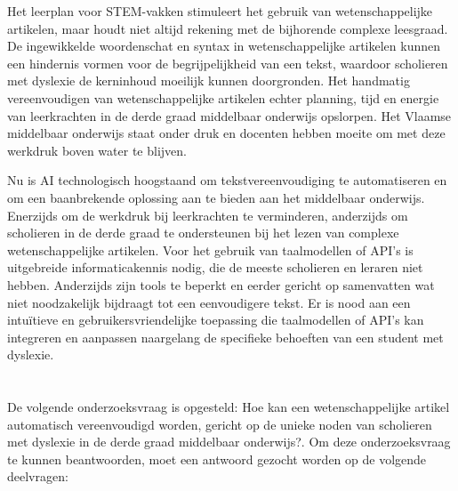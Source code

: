 \medspace

Het leerplan voor STEM-vakken stimuleert het gebruik van wetenschappelijke artikelen, maar houdt niet altijd rekening met de bijhorende complexe leesgraad. De ingewikkelde woordenschat en syntax in wetenschappelijke artikelen kunnen een hindernis vormen voor de begrijpelijkheid van een tekst, waardoor scholieren met dyslexie de kerninhoud moeilijk kunnen doorgronden. Het handmatig vereenvoudigen van wetenschappelijke artikelen echter planning, tijd en energie van leerkrachten in de derde graad middelbaar onderwijs opslorpen. Het Vlaamse middelbaar onderwijs staat onder druk en docenten hebben moeite om met deze werkdruk boven water te blijven. 

\medspace

Nu is AI technologisch hoogstaand om tekstvereenvoudiging te automatiseren en om een baanbrekende oplossing aan te bieden aan het middelbaar onderwijs. Enerzijds om de werkdruk bij leerkrachten te verminderen, anderzijds om scholieren in de derde graad te ondersteunen bij het lezen van complexe wetenschappelijke artikelen. Voor het gebruik van taalmodellen of API's is uitgebreide informaticakennis nodig, die de meeste scholieren en leraren niet hebben. Anderzijds zijn tools te beperkt en eerder gericht op samenvatten wat niet noodzakelijk bijdraagt tot een eenvoudigere tekst. Er is nood aan een intuïtieve en gebruikersvriendelijke toepassing die taalmodellen of API's kan integreren en aanpassen naargelang de specifieke behoeften van een student met dyslexie.

\section{}%
\label{sec:onderzoeksvraag}

De volgende onderzoeksvraag is opgesteld: Hoe kan een wetenschappelijke artikel automatisch vereenvoudigd worden, gericht op de unieke noden van scholieren met dyslexie in de derde graad middelbaar onderwijs?. Om deze onderzoeksvraag te kunnen beantwoorden, moet een antwoord gezocht worden op de volgende deelvragen:

